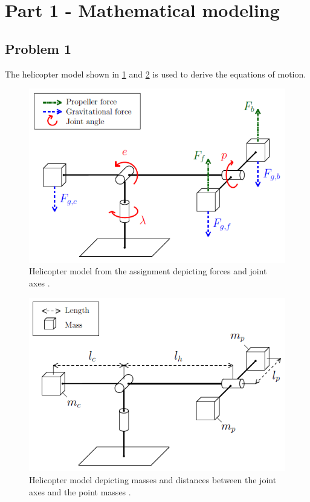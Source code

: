 
\section{Part 1 - Mathematical modeling}
\subsection{Problem 1}
\label{subsec:problem 1}
%
The helicopter model shown in \cref{fig:helicopter_model_forces} and
\cref{fig:helicopter_model_masses} is used to derive the equations of motion.
%
\begin{figure}[hbp]
  \caption{Helicopter model from the assignment depicting
    forces and joint axes \cite[p.12]{assignment}.}
  \label{fig:helicopter_model_forces}
  \includegraphics[width=\textwidth]{images/helicopter_model_forces}
\end{figure}
%
\begin{figure}[H]
  \caption{Helicopter model depicting
    masses and distances between the joint axes and the point masses
    \cite[p.13]{assignment}.}
  \label{fig:helicopter_model_masses}
  \includegraphics[width=\textwidth]{images/helicopter_model_masses}
\end{figure}
